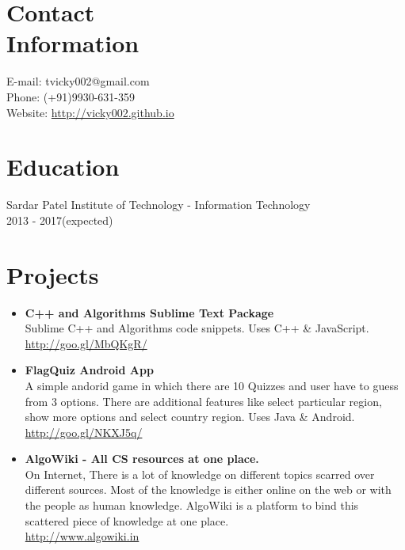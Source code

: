 \documentclass[margin,line]{res}
\begin{document}

\begin{resume}

\section{Contact\\Information}  
E-mail: tvicky002@gmail.com\\
Phone: (+91)9930-631-359\\
Website: \url{http://vicky002.github.io}\\



\section{Education}
Sardar Patel Institute of Technology - Information Technology\\
2013 - 2017(expected)\\

\section{Projects}
\begin{itemize} \itemsep -4pt
\item \textbf{C++ and Algorithms Sublime Text Package }\\
Sublime C++ and Algorithms code snippets. Uses C++ \& JavaScript. \\
\url{http://goo.gl/MbQKgR/}\\

\item \textbf{FlagQuiz Android App}\\
A simple andorid game in which there are 10 Quizzes and user have to guess from 3 options. There are additional features like select particular region, show more options and select country region. Uses Java \& Android.\\
 \url{http://goo.gl/NKXJ5q/}\\

\item \textbf{AlgoWiki - All CS resources at one place.}\\
On Internet, There is a lot of knowledge on different topics scarred over different sources. Most of the knowledge is
either online on the web or with the people as human knowledge. AlgoWiki is a platform to bind this scattered piece of knowledge at one place. \\
\url{http://www.algowiki.in}\\


\end{itemize}
\end{resume}
\end{document}
